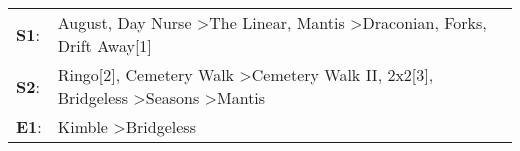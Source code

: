\begin{supertabular}{p{0.03\textwidth}p{0.92\textwidth}}
 \textbf{S1}:  &                      August\textsuperscript{}, \enspace Day Nurse\textsuperscript{} \textgreater \enspace The Linear\textsuperscript{}, \enspace Mantis\textsuperscript{} \textgreater \enspace Draconian\textsuperscript{}, \enspace Forks\textsuperscript{}, \enspace Drift Away[1]\textsuperscript{}  \enspace  \\
 \textbf{S2}:  &  Ringo[2]\textsuperscript{}, \enspace Cemetery Walk\textsuperscript{} \textgreater \enspace Cemetery Walk II\textsuperscript{}, \enspace 2x2[3]\textsuperscript{}, \enspace Bridgeless\textsuperscript{} \textgreater \enspace Seasons\textsuperscript{} \textgreater \enspace Mantis\textsuperscript{}  \enspace  \\
 \textbf{E1}:  &                                                                                                                                                                                                                             Kimble\textsuperscript{} \textgreater \enspace Bridgeless\textsuperscript{}  \enspace  \\
\end{supertabular}
